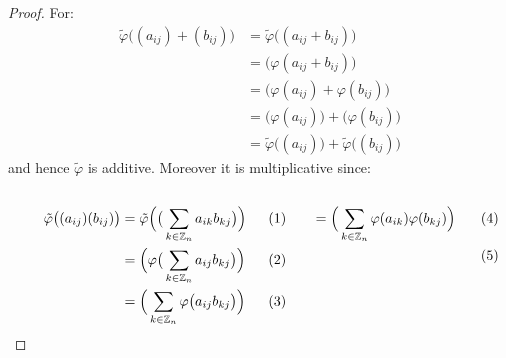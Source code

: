             \begin{proof}
                For:
                \begin{subequations}
                    \begin{align}
                        \tilde{\varphi}\big((a_{ij})+(b_{ij})\big)
                        &=\tilde{\varphi}\big((a_{ij}+b_{ij})\big)\\
                        &=\big(\varphi(a_{ij}+b_{ij})\big)\\
                        &=\big(\varphi(a_{ij})+\varphi(b_{ij})\big)\\
                        &=\big(\varphi(a_{ij})\big)
                            +\big(\varphi(b_{ij})\big)\\
                        &=\tilde{\varphi}\big((a_{ij})\big)+
                            \tilde{\varphi}\big((b_{ij})\big)
                    \end{align}
                \end{subequations}
                and hence $\tilde{\varphi}$ is additive. Moreover it is
                multiplicative since:
                \par
                \begin{subequations}
                    \begin{minipage}[t]{0.55\textwidth}
                        \centering
                        \begin{align}
                            \tilde{\varphi}\big((a_{ij})(b_{ij})\big)
                            &=\tilde{\varphi}\Big(
                                \big(\sum_{k\in\mathbb{Z}_{n}}
                                    a_{ik}b_{kj}\big)
                            \Big)\\
                            &=\Big(\varphi\big(
                                \sum_{k\in\mathbb{Z}_{n}}a_{ij}b_{kj}\big)
                                \Big)\\
                            &=\Big(\sum_{k\in\mathbb{Z}_{n}}
                                \varphi\big(a_{ij}b_{kj}\big)\Big)
                        \end{align}
                    \end{minipage}
                    \hfill
                    \begin{minipage}[t]{0.44\textwidth}
                        \centering
                        \begin{align}
                            &=\Big(\sum_{k\in\mathbb{Z}_{n}}
                                \varphi(a_{ik})\varphi(b_{kj})\Big)\\

\end{align}
\end{minipage}
\end{subequations}
\end{proof}
